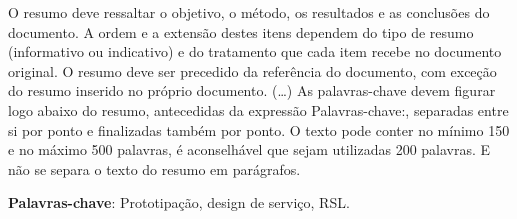 \begin{resumo}
 O resumo deve ressaltar o objetivo, o método, os resultados e as conclusões 
 do documento. A ordem e a extensão
 destes itens dependem do tipo de resumo (informativo ou indicativo) e do
 tratamento que cada item recebe no documento original. O resumo deve ser
 precedido da referência do documento, com exceção do resumo inserido no
 próprio documento. (\ldots) As palavras-chave devem figurar logo abaixo do
 resumo, antecedidas da expressão Palavras-chave:, separadas entre si por
 ponto e finalizadas também por ponto. O texto pode conter no mínimo 150 e 
 no máximo 500 palavras, é aconselhável que sejam utilizadas 200 palavras. 
 E não se separa o texto do resumo em parágrafos.

 \vspace{\onelineskip}
    
 \noindent
 \textbf{Palavras-chave}: Prototipação, design de serviço, RSL.
\end{resumo}

